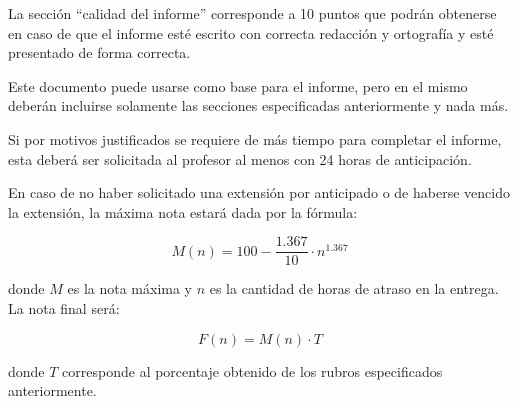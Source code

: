 \documentclass[12pt,letterpaper]{IEEEtran}
\begin{document}
La sección ``calidad del informe'' corresponde a 10 puntos que podrán obtenerse en caso de que el informe esté escrito con correcta redacción y ortografía y esté presentado de forma correcta.

Este documento puede usarse como base para el informe, pero en el mismo deberán incluirse solamente las secciones especificadas anteriormente y nada más.

Si por motivos justificados se requiere de más tiempo para completar el informe, esta deberá ser solicitada al profesor al menos con 24 horas de anticipación.

En caso de no haber solicitado una extensión por anticipado o de haberse vencido la extensión, la máxima nota estará dada por la fórmula:

\[ M(n) = 100-\frac{1.367}{10}\cdot n^{1.367} \]

donde $M$ es la nota máxima y $n$ es la cantidad de horas de atraso en la entrega. La nota final será:

\[ F(n) = M(n)\cdot T \]

donde $T$ corresponde al porcentaje obtenido de los rubros especificados anteriormente.
\end{document}

